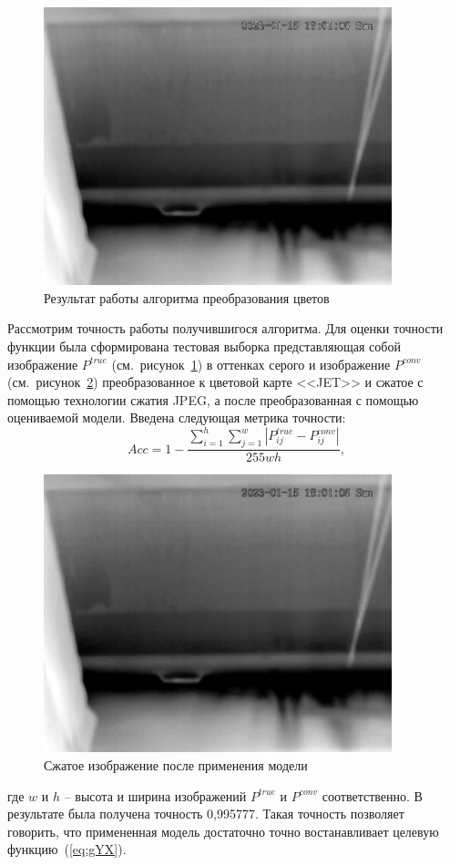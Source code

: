 \documentclass[14pt, a4paper]{extreport}
\begin{document}
	\begin{figure}[h!]
		\centering
		\includegraphics[width = 0.9\textwidth, height = 0.475\textwidth]{image/chapter_2/gray_tep_example}
		\vspace*{-0.2cm}	
		\caption{Результат работы алгоритма преобразования цветов}
		\label{fig:grey1}
		\vspace*{0.4cm}
	\end{figure}
	Рассмотрим точность работы получившигося алгоритма. Для оценки точности функции была сформирована тестовая выборка представляющая собой изображение $P^{true}$ (см.~рисунок~\ref{fig:grey1}) в оттенках серого и изображение $P^{conv}$ (см.~рисунок~\ref{fig:grey2}) преобразованное к цветовой карте <<JET>> и сжатое с помощью технологии сжатия JPEG, а после преобразованная с помощью оцениваемой модели. Введена следующая метрика точности:
	\begin{equation}
		Acc = 1 - \frac{\sum\limits_{i=1}^h \sum\limits_{j=1}^w |P^{true}_{ij} - P^{conv}_{ij}|}{255wh},
		\label{eq:flanaccuracy}
	\end{equation}
	\begin{figure}[h!]
		\centering
		\includegraphics[width = 0.9\textwidth, height = 0.475\textwidth]{image/chapter_2/grey2}
		\vspace*{-0.2cm}
		\caption{Сжатое изображение после применения модели}
		\label{fig:grey2}
	\end{figure}
	где $w$ и $h$ -- высота и ширина изображений $P^{true}$ и $P^{conv}$ соответственно. В результате была получена точность 0,995777. Такая точность позволяет \\ говорить, что примененная модель достаточно точно востанавливает целевую функцию~(\ref{eq:gYX}).
	
\end{document}
